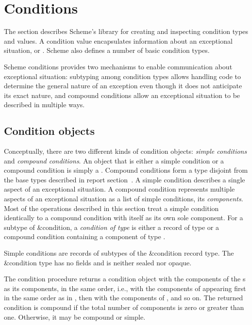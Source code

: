 \section{Conditions}
\label{conditionssection}

The section describes Scheme's  library 
for creating and inspecting
condition types and values. A condition value encapsulates information
about an exceptional situation, or
. Scheme also defines a
number of basic condition types.

Scheme conditions provides two mechanisms to enable communication
about exceptional situation: subtyping among condition types allows
handling code to determine the general nature of an exception even
though it does not anticipate its exact nature, and compound
conditions allow an exceptional situation to be described in multiple
ways.

\subsection{Condition objects}

Conceptually, there are two different kinds of condition objects:
\textit{simple conditions} and
\textit{compound conditions}.  An object
that is either a simple condition or a compound condition is 
simply a .  Compound conditions form a type disjoint
from the base types described in report
section~.  A simple condition
describes a single aspect of an exceptional situation.  A compound
condition represents multiple aspects of an exceptional situation as a
list of simple conditions, its \textit{components}.  Most of the
operations described in this section treat a simple condition
identically to a compound condition with itself as its own sole component.  For a
subtype  of {\cf\&condition}, a \textit{condition of type
  } is either a record of type  or a compound condition
containing a component of type .

\begin{entry}{%
}

Simple conditions are records of subtypes of the {\cf\&condition}
record type.  The {\cf\&condition} type has no fields and is neither sealed nor opaque.
\end{entry}

\begin{entry}{%
}

The {\cf condition}
procedure returns a condition object with the components of the
s as its components, in the same order, i.e., with the
components of  appearing first in the same order as in
, then with the components of , and so on.  The
returned condition is compound if the total number of components is
zero or greater than one.  Otherwise, it may be compound or simple.
\end{entry}

